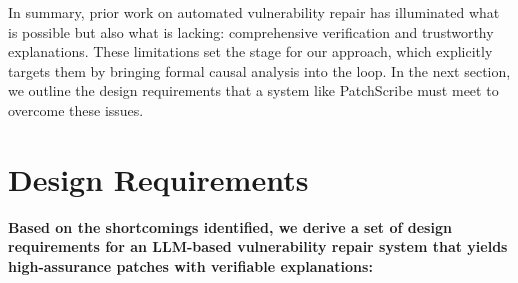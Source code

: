 \documentclass[conference,compsoc]{IEEEtran}
\begin{document}
In summary, prior work on automated vulnerability repair has illuminated
what is possible but also what is lacking: comprehensive verification
and trustworthy explanations. These limitations set the stage for our
approach, which explicitly targets them by bringing formal causal
analysis into the loop. In the next section, we outline the design
requirements that a system like PatchScribe must meet to overcome these
issues.

\section{Design Requirements}\label{design-requirements}

\textbf{Based on the shortcomings identified, we derive a set of design
requirements for an LLM-based vulnerability repair system that yields
high-assurance patches with verifiable explanations:}
\end{document}

